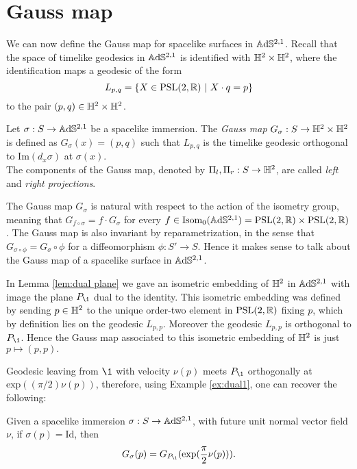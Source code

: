 \section{Gauss map} \label{sec:gauss map}
We can now define the Gauss map for spacelike surfaces in $\mathbb{A}\mathrm{d}\mathbb{S}^{2,1}$. Recall that the space of timelike geodesics in $\mathbb{A}\mathrm{d}\mathbb{S}^{2,1}$ is identified with $\mathbb{H}^2\times\mathbb{H}^2$, where the identification maps a geodesic of the form
\[
    L_{p,q}=\{ X \in\text{PSL}(2,\mathbb{R}) \ | \ X \cdot q = p \}
\]
to the pair $(p,q) \in \mathbb{H}^2\times\mathbb{H}^2$. 
\begin{definition}
    Let $\sigma :S \to\mathbb{A}\mathrm{d}\mathbb{S}^{2,1}$ be a spacelike immersion. The \textit{Gauss map} $G_\sigma : S \to \mathbb{H}^2 \times \mathbb{H}^2$ is defined as $G_\sigma(x) = (p,q)$ such that $L_{p,q}$ is the timelike geodesic orthogonal to $\text{Im}(d_x\sigma)$ at $\sigma(x)$.\\
    The components of the Gauss map, denoted by $\Pi_l, \Pi_r : S \to \mathbb{H}^2$, are called \textit{left} and \textit{right projections}. 
\end{definition}
The Gauss map $G_\sigma$ is natural with respect to the action of the isometry group, meaning that $G_{f\circ\sigma} = f \cdot G_\sigma$ for every $f \in\text{Isom}_0(\mathbb{A}\mathrm{d}\mathbb{S}^{2,1}) = \text{PSL}(2,\mathbb{R})\times\text{PSL}(2,\mathbb{R})$. The Gauss map is also invariant by reparametrization, in the sense that $G_{\sigma \circ \phi} = G_\sigma \circ \phi$ for a diffeomorphism $\phi:S'\to S$. Hence it makes sense to talk about the Gauss map of a spacelike surface in $\mathbb{A}\mathrm{d}\mathbb{S}^{2,1}$.

\begin{example}\label{ex:dual1}
    In Lemma \ref{lem:dual plane} we gave an isometric embedding of $\mathbb{H}^2$ in $\mathbb{A}\mathrm{d}\mathbb{S}^{2,1}$ with image the plane $P_{\1}$ dual to the identity. This isometric embedding was defined by sending $p\in\mathbb{H}^2$ to the unique order-two element in $\text{PSL}(2,\mathbb{R})$ fixing $p$, which by definition lies on the geodesic $L_{p,p}$. Moreover the geodesic $L_{p,p}$ is orthogonal to $P_{\1}$. Hence the Gauss map associated to this isometric embedding of $\mathbb{H}^2$ is just $p\mapsto (p,p).$
\end{example}
Geodesic leaving from $\1$ with velocity $\nu(p)$ meets $P_\1$ orthogonally at $\text{exp}((\pi/2)\nu(p))$, therefore, using Example \ref{ex:dual1}, one can recover the following:

\begin{lemma}\label{lem:Gaussid}
    Given a spacelike immersion $\sigma:S\to\mathbb{A}\mathrm{d}\mathbb{S}^{2,1}$, with future unit normal vector field $\nu$, if $\sigma(p)=\text{Id}$, then 
    \begin{equation}\label{eq:Gaussid}
        G_\sigma(p)=G_{P_\1}(\exp(\frac{\pi}{2}\nu(p))).
    \end{equation}
\end{lemma}

